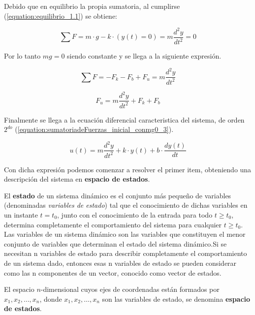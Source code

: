 \documentclass[a4paper]{article}
\begin{document}
Debido que en equilibrio la propia sumatoria, al cumplirse (\ref{equation:equilibrio_1.1}) se obtiene:

   \begin{equation}\label{equation:sumatoriadeFuerzas_inicial_en_eq}
	\sum F = m\cdot g -k \cdot (y(t) =  0) = m \frac{d^2 y}{dt^2 } = 0 
	\end{equation}

Por lo tanto $mg = 0$ siendo constante y se llega a la siguiente expresión.

 \begin{equation}\label{equation:sumatoriadeFuerzas_inicial_conmg0}
	\sum F = - F_k - F_b + F_u = m \frac{d^2 y}{dt^2 }
\end{equation}



\begin{equation}\label{equation:sumatoriadeFuerzas_inicial_conmg0_2}
	 F_u = m \frac{d^2 y}{dt^2 } + F_k + F_b 
\end{equation}

Finalmente se llega a la ecuación diferencial caracteristica del sistema, de orden $2^{do}$ (\ref{equation:sumatoriadeFuerzas_inicial_conmg0_3}).

\begin{equation}\label{equation:sumatoriadeFuerzas_inicial_conmg0_3}
	u(t) = m \frac{d^2 y}{dt^2 } + k \cdot y(t) + b \cdot \frac{dy(t)}{dt}
\end{equation}


Con dicha expresión podemos comenzar a resolver el primer item, obteniendo una descripción del sistema en \textbf{espacio de estados}.

El \textbf{estado} de un sistema dinámico es el conjunto más pequeño de variables 
(denominadas \textit{variables de estado}) tal que el conocimiento de dichas variables 
en un instante $t = t_0$, junto con el conocimiento de la entrada para todo 
$t \geq t_0$, determina completamente el comportamiento del sistema para 
cualquier $t \geq t_0$. Las variables de un sistema dinámico son las variables que constituyen el menor conjunto de variables que determinan el estado del sistema dinámico.Si se necesitan n variables de estado para describir completamente el comportamiento de un sistema dado, entonces esas n variables de estado se pueden considerar como las n componentes de un vector, conocido como vector de estados.

El espacio $n$-dimensional cuyos ejes de coordenadas están formados por 
$x_1, x_2, \ldots, x_n$, donde $x_1, x_2, \ldots, x_n$ son las variables de 
estado, se denomina \textbf{espacio de estados}. 
\end{document}
